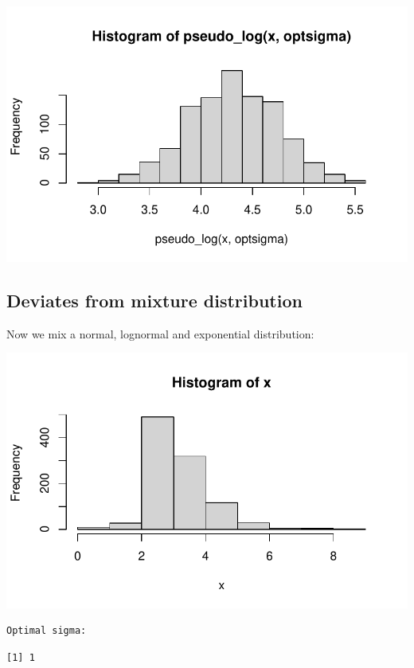 \documentclass[
  letterpaper,
  DIV=11,
  numbers=noendperiod]{scrreport}
\begin{document}
\includegraphics{./Pseudo_log_explainer_files/figure-pdf/pl07-3.pdf}

\hypertarget{deviates-from-mixture-distribution}{%
\subsection{Deviates from mixture
distribution}\label{deviates-from-mixture-distribution}}

Now we mix a normal, lognormal and exponential distribution:

\includegraphics{./Pseudo_log_explainer_files/figure-pdf/pl08-1.pdf}

\begin{verbatim}
Optimal sigma: 
\end{verbatim}

\begin{verbatim}
[1] 1
\end{verbatim}
\end{document}
